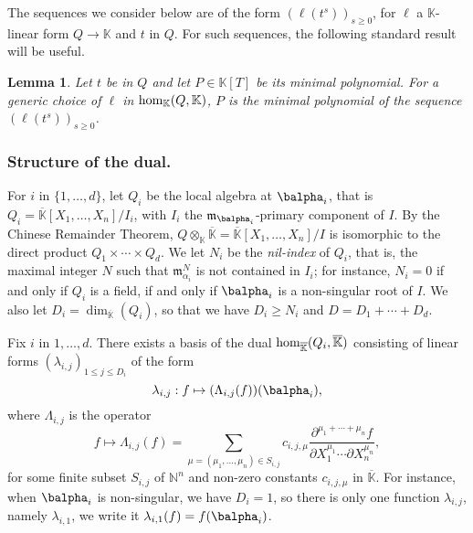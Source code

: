 \documentclass[12pt]{article}
\newtheorem{Lemma}{Lemma}
\def\N {\ensuremath{\mathbb{N}}}
\def\K {\ensuremath{\mathbb{K}}}
\def\Kbar {{\ensuremath{\overline{\mathbb{K}}}}}
\def\D {\ensuremath{D}}
\def\m {\ensuremath{\mathfrak{m}}}
\def\K{\mathbb{K}}
\begin{document}
The sequences we consider below are of the form $(\ell(t^s))_{s \ge
	0}$, for $\ell$ a $\K$-linear form $Q \to \K$ and $t$ in $Q$. For such
sequences, the following standard result will be useful.
\begin{Lemma}\label{lemma:minpoly}
	Let $t$ be in $Q$ and let $P \in \K[T]$ be its minimal
	polynomial. For a generic choice of $\ell$ in ${\rm hom}_\K(Q,\K)$,
	$P$ is the minimal polynomial of the sequence $(\ell(t^s))_{s \ge
		0}$.
\end{Lemma}





\subsubsection{Structure of the dual.}
For $i$ in $\{1,\dots,d\}$, let $Q_i$ be the local algebra at
$\balpha_i$, that is $Q_i=\Kbar[X_1,\dots,X_n]/I_i$, with $I_i$ the
$\m_{\balpha_i}$-primary component of $I$. By the Chinese Remainder
Theorem, $Q\otimes_\K \Kbar=\Kbar[X_1,\dots,X_n]/I$ is isomorphic to
the direct product $Q_1\times \cdots \times Q_d$.  We let $N_i$ be the
{\em nil-index} of $Q_i$, that is, the maximal integer $N$ such that
$\m_{\alpha_i}^N$ is not contained in $I_i$; for instance, $N_i=0$ if
and only if $Q_i$ is a field, if and only if $\balpha_i$ is a
non-singular root of $I$. We also let
$\D_i=\dim_\Kbar(Q_i)$, so that we have $D_i \ge N_i$ and $\D=\D_1 + \cdots + \D_d$.

Fix $i$ in $1,\dots,d$.  There exists a basis of the dual ${\rm
	hom}_\Kbar(Q_i,\Kbar)$ consisting of linear forms
$(\lambda_{i,j})_{1\le j \le \D_i}$ of the form
$$\lambda_{i,j}: f \mapsto (\Lambda_{i,j}(f))(\balpha_i),$$
where $\Lambda_{i,j}$ is the operator
$$f \mapsto \Lambda_{i,j}(f) = \sum_{\mu=(\mu_1,\dots,\mu_n) \in
	S_{i,j}} c_{i,j,\mu} \frac{ \partial^{\mu_1 + \cdots + \mu_n} f}
{\partial X_1^{\mu_1} \cdots \partial X_n^{\mu_n}},$$ for some finite
subset $S_{i,j}$ of $\N^n$ and non-zero constants $c_{i,j,\mu}$ in
$\Kbar$. 
For instance, when $\balpha_i$ is non-singular, we have $D_i=1$, so
there is only one function $\lambda_{i,j}$, namely $\lambda_{i,1}$, we
write it $\lambda_{i,1}(f) = f(\balpha_i)$.
\end{document}
